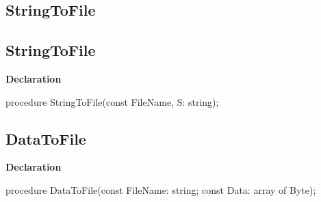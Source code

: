 \documentclass{report}
\newif\ifpdf
\begin{document}
\subsection*{\large{\textbf{StringToFile}}\normalsize\hspace{1ex}\hrulefill}
\else
\subsection*{StringToFile}
\fi
\label{PasDoc_Utils-StringToFile}
\begin{list}{}{
\setlength{\itemindent}{0cm}
\setlength{\listparindent}{0cm}
\setlength{\leftmargin}{\evensidemargin}
\addtolength{\leftmargin}{\tmplength}
\settowidth{\labelsep}{X}
\addtolength{\leftmargin}{\labelsep}
\setlength{\labelwidth}{\tmplength}
}
\item[\textbf{Declaration}\hfill]
\ifpdf
\begin{flushleft}
\fi
\begin{ttfamily}
procedure StringToFile(const FileName, S: string);\end{ttfamily}

\ifpdf
\end{flushleft}
\fi

\end{list}
\ifpdf
\subsection*{\large{\textbf{DataToFile}}\normalsize\hspace{1ex}\hrulefill}
\else
\subsection*{DataToFile}
\fi
\label{PasDoc_Utils-DataToFile}
\begin{list}{}{
\setlength{\itemindent}{0cm}
\setlength{\listparindent}{0cm}
\setlength{\leftmargin}{\evensidemargin}
\addtolength{\leftmargin}{\tmplength}
\settowidth{\labelsep}{X}
\addtolength{\leftmargin}{\labelsep}
\setlength{\labelwidth}{\tmplength}
}
\item[\textbf{Declaration}\hfill]
\ifpdf
\begin{flushleft}
\fi
\begin{ttfamily}
procedure DataToFile(const FileName: string; const Data: array of Byte);\end{ttfamily}

\ifpdf
\end{flushleft}
\fi

\end{list}
\ifpdf
\end{document}
